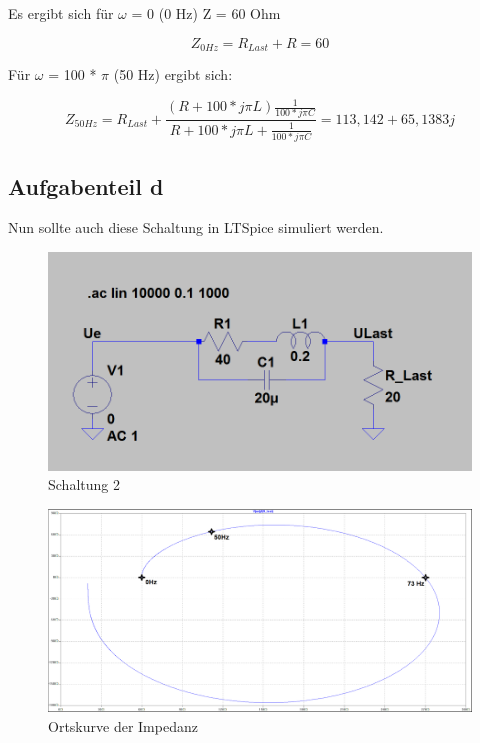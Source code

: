 \documentclass[%
  a4paper, %
  12pt, %
   article, %
  titlepage
]{scrartcl}
\begin{document}
Es ergibt sich für $\omega$ = 0 (0 Hz) Z = 60 Ohm

\begin{equation}
Z_{0Hz}=R_{Last}+R = 60
\end{equation}

Für $\omega$ = 100 * $\pi$ (50 Hz) ergibt sich:

\begin{equation}
Z_{50Hz}=R_{Last}+\frac{(R+100*j\pi L)\frac{1}{100*j\pi C}}{R+100*j\pi L+\frac{1}{100*j\pi C}} = 113,142 + 65,1383 j
\end{equation}


\subsection{Aufgabenteil d}
Nun sollte auch diese Schaltung in LTSpice simuliert werden.

\begin{figure}[h]
\includegraphics[width=\textwidth]{schematic3.png}
\caption{Schaltung 2}
\label{fig7}
\end{figure}

\clearpage

\begin{figure}[h]
\includegraphics[width=\textwidth]{plot2.png}
\caption{Ortskurve der Impedanz}
\label{fig8}
\end{figure}
\end{document}
